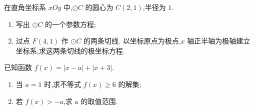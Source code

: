 \begin{problem}
在直角坐标系 \(xOy\) 中,\(\odot C\) 的圆心为 \(C(2,1)\),半径为 \(1\).

\begin{enumerate}
\item 写出 \(\odot C\) 的一个参数方程;
\item 过点 \(F(4,1)\) 作 \(\odot C\) 的两条切线. 以坐标原点为极点,\(x\) 轴正半轴为极轴建立坐标系,求这两条切线的极坐标方程.
\end{enumerate}
\end{problem}

\begin{problem}
已知函数 \(f(x)=|x-a|+|x+3|\).

\begin{enumerate}
\item 当 \(a=1\) 时,求不等式 \(f(x)\ge6\) 的解集;
\item 若 \(f(x)>-a\),求 \(a\) 的取值范围.
\end{enumerate}
\end{problem}

